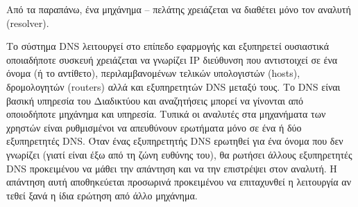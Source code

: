 Από τα παραπάνω, ένα μηχάνημα -- πελάτης χρειάζεται να διαθέτει μόνο τον αναλυτή (resolver).

Το σύστημα DNS λειτουργεί στο επίπεδο εφαρμογής και εξυπηρετεί ουσιαστικά οποιαδήποτε συσκευή χρειάζεται να γνωρίζει IP διεύθυνση που αντιστοιχεί σε ένα όνομα (ή το αντίθετο), περιλαμβανομένων τελικών υπολογιστών (hosts), δρομολογητών (routers) αλλά και εξυπηρετητών DNS
μεταξύ τους. Το DNS είναι βασική υπηρεσία του Διαδικτύου και αναζητήσεις μπορεί να γίνονται από οποιοδήποτε μηχάνημα και υπηρεσία. Τυπικά οι αναλυτές στα μηχανήματα των χρηστών είναι ρυθμισμένοι να απευθύνουν ερωτήματα μόνο σε ένα ή δύο εξυπηρετητές DNS. Όταν ένας εξυπηρετητής DNS ερωτηθεί για ένα όνομα που δεν γνωρίζει (γιατί είναι έξω από τη ζώνη ευθύνης του), θα ρωτήσει άλλους εξυπηρετητές DNS προκειμένου να μάθει την απάντηση και να την επιστρέψει στον αναλυτή. Η απάντηση αυτή αποθηκεύεται προσωρινά προκειμένου να επιταχυνθεί η λειτουργία αν τεθεί ξανά η ίδια ερώτηση από άλλο μηχάνημα.